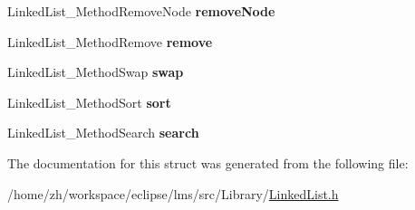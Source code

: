 \begin{DoxyCompactItemize}
\item 
\hypertarget{structLinkedListMethods_abf72d96ec7440456fa524c4e45640681}{Linked\-List\-\_\-\-Method\-Remove\-Node {\bfseries remove\-Node}}\label{structLinkedListMethods_abf72d96ec7440456fa524c4e45640681}

\item 
\hypertarget{structLinkedListMethods_a465baf42ba3c3b387e04df653ce2af43}{Linked\-List\-\_\-\-Method\-Remove {\bfseries remove}}\label{structLinkedListMethods_a465baf42ba3c3b387e04df653ce2af43}

\item 
\hypertarget{structLinkedListMethods_a9c935eba2050b587631f7040f656ec13}{Linked\-List\-\_\-\-Method\-Swap {\bfseries swap}}\label{structLinkedListMethods_a9c935eba2050b587631f7040f656ec13}

\item 
\hypertarget{structLinkedListMethods_ab5e5414b4098741dee849a9746811e0a}{Linked\-List\-\_\-\-Method\-Sort {\bfseries sort}}\label{structLinkedListMethods_ab5e5414b4098741dee849a9746811e0a}

\item 
\hypertarget{structLinkedListMethods_ac6c300cf4e225d459a922e7ce870a3fa}{Linked\-List\-\_\-\-Method\-Search {\bfseries search}}\label{structLinkedListMethods_ac6c300cf4e225d459a922e7ce870a3fa}

\end{DoxyCompactItemize}


The documentation for this struct was generated from the following file\-:\begin{DoxyCompactItemize}
\item 
/home/zh/workspace/eclipse/lms/src/\-Library/\hyperlink{LinkedList_8h}{Linked\-List.\-h}\end{DoxyCompactItemize}

